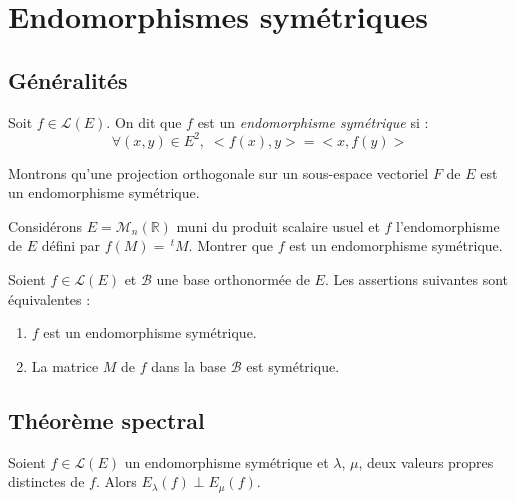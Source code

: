 \documentclass[a4paper,10pt]{report}
\begin{document}
\section{Endomorphismes symétriques}
\subsection{Généralités}
\begin{defin}
Soit $f \in \mathcal{L}(E)$. On dit que $f$ est un \textit{endomorphisme symétrique} si : 
$$ \forall (x,y) \in E^2, \; <f(x),y>=<x,f(y)>$$
\end{defin}

\begin{ex} Montrons qu'une projection orthogonale sur un sous-espace vectoriel $F$ de $E$ est un endomorphisme symétrique.

\vspace{5cm}
\end{ex}

\begin{exa} Considérons $E=\mathcal{M}_n(\mathbb{R})$ muni du produit scalaire usuel et $f$ l'endomorphisme de $E$ défini par $f(M) = \, ^t M$. Montrer que $f$ est un endomorphisme symétrique.
\end{exa}

\begin{prop}
Soient $f \in \mathcal{L}(E)$ et $\mathcal{B}$ une base orthonormée de $E$. Les assertions suivantes sont équivalentes :
\begin{enumerate}
\item $f$ est un endomorphisme symétrique.
\item La matrice $M$ de $f$ dans la base $\mathcal{B}$ est symétrique.
\end{enumerate}
\end{prop}

\begin{preuve}
\vspace{7cm}
\end{preuve}

\subsection{Théorème spectral}
\begin{prop} Soient $f \in \mathcal{L}(E)$ un endomorphisme symétrique et $\lambda$, $\mu$, deux valeurs propres distinctes de $f$. Alors $E_{\lambda}(f) \perp E_{\mu}(f)$.
\end{prop}
\end{document}

